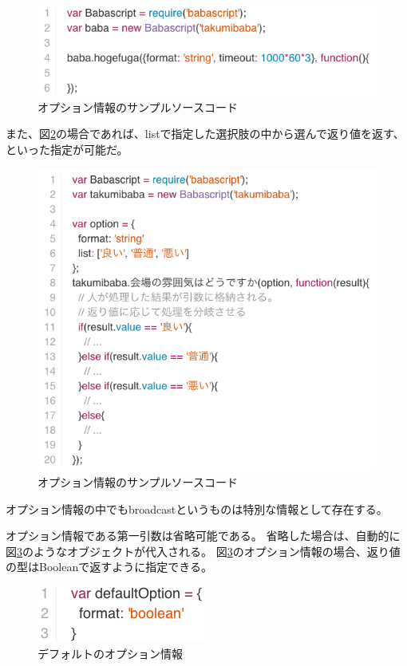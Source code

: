 \begin{figure}[htbp]
  \begin{center}
  \includegraphics[width=.8\linewidth,bb=0 0 563 149]{images/babascript_option_sample.js.png}
  \end{center}
  \caption{オプション情報のサンプルソースコード}
  \label{fig:babascript_option}
\end{figure}

また、図\ref{fig:babascript_option_list}の場合であれば、listで指定した選択肢の中から選んで返り値を返す、といった指定が可能だ。

\begin{figure}[htbp]
  \begin{center}
  \includegraphics[width=.5\linewidth,bb=0 0 574 513]{images/babascript_option_list.js.png}
  \end{center}
  \caption{オプション情報のサンプルソースコード}
  \label{fig:babascript_option_list}
\end{figure}

オプション情報の中でもbroadcastというものは特別な情報として存在する。

オプション情報である第一引数は省略可能である。
省略した場合は、自動的に図\ref{fig:option_default}のようなオブジェクトが代入される。
図\ref{fig:option_default}のオプション情報の場合、返り値の型はBooleanで返すように指定できる。

\begin{figure}[htbp]
  \begin{center}
  \includegraphics[width=.4\linewidth,bb=0 0 210 70]{images/option_default.js.png}
  \end{center}
  \caption{デフォルトのオプション情報}
  \label{fig:option_default}
\end{figure}

